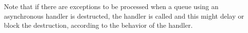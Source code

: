 Note that if there are exceptions to be processed when a queue
using an asynchronous handler is destructed, the handler is called and
this might delay or block the destruction, according to the behavior
of the handler.


